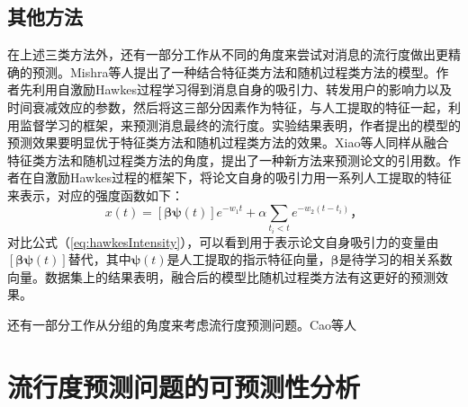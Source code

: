 \subsection{其他方法}
在上述三类方法外，还有一部分工作从不同的角度来尝试对消息的流行度做出更精确的预测。Mishra等人\citep{mishra2016feature}提出了一种结合特征类方法和随机过程类方法的模型。作者先利用自激励Hawkes过程学习得到消息自身的吸引力、转发用户的影响力以及时间衰减效应的参数，然后将这三部分因素作为特征，与人工提取的特征一起，利用监督学习的框架，来预测消息最终的流行度。实验结果表明，作者提出的模型的预测效果要明显优于特征类方法和随机过程类方法的效果。Xiao等人\citep{xiao2016modeling}同样从融合特征类方法和随机过程类方法的角度，提出了一种新方法来预测论文的引用数。作者在自激励Hawkes过程的框架下，将论文自身的吸引力用一系列人工提取的特征来表示，对应的强度函数如下：
\begin{equation}
\label{eq:citationIntensity}
x(t)=[\boldsymbol{\beta} \boldsymbol{\psi}(t)]e^{-w_1 t}+\alpha \sum_{t_i<t}e^{-w_2(t-t_i)}\text{，}
\end{equation}
对比公式（\ref{eq:hawkesIntensity}），可以看到用于表示论文自身吸引力的变量由$[\boldsymbol{\beta} \boldsymbol{\psi}(t)]$替代，其中$\boldsymbol{\psi}(t)$是人工提取的指示特征向量，$\boldsymbol{\beta}$是待学习的相关系数向量。数据集上的结果表明，融合后的模型比随机过程类方法有这更好的预测效果。

还有一部分工作从分组的角度来考虑流行度预测问题。Cao等人\citep{cao2017predicting}
\section{流行度预测问题的可预测性分析}

